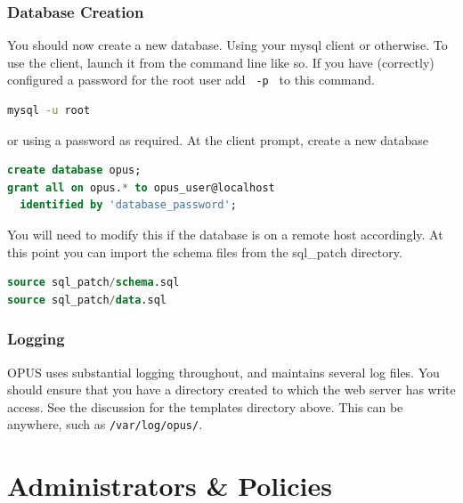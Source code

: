 \documentclass[12 pt]{book}
\begin{document}

\subsection{Database Creation}

You should now create a new database. Using your mysql client or otherwise. To use the client, launch it from the
command line like so. If you have (correctly) configured a password for the root user add \lstinline! -p ! to this command.
\begin{lstlisting}[language=bash]
mysql -u root
\end{lstlisting}
or using a password as required. At the client prompt, create a new database
\begin{lstlisting}[language=SQL]
create database opus;
grant all on opus.* to opus_user@localhost
  identified by 'database_password';
\end{lstlisting}

You will need to modify this if the database is on a remote host accordingly. At this point
you can import the schema files from the sql\_patch directory.
\begin{lstlisting}[language=SQL]
source sql_patch/schema.sql
source sql_patch/data.sql
\end{lstlisting}

\subsection{Logging}

OPUS uses substantial logging throughout, and maintains several log files. You should ensure that you have a directory created to which
the web server has write access. See the discussion for the templates directory above. This can be anywhere, such as \lstinline!/var/log/opus/!.

\chapter{Administrators \& Policies}
\end{document}
